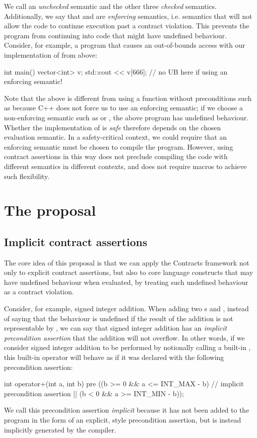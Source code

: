 We call  an \emph{unchecked} semantic and the other three \emph{checked} semantics. Additionally, we say that \mbox{} and  are \emph{enforcing} semantics, i.e. semantics that will not allow the code to continue execution past a contract violation. This prevents the program from continuing into code that might have undefined behaviour. Consider, for example, a program that causes an out-of-bounds access with our implementation of  from above:
\begin{codeblock}
int main() {
  vector<int> v;
  std::cout << v[666];    // no UB here if using an enforcing semantic!
}
\end{codeblock}
Note that the above is different from using a function without preconditions such as \mbox{} because C++ does not force us to use an enforcing semantic; if we choose a non-enforcing semantic such as  or , the above program  has undefined behaviour. Whether the implementation of   is \emph{safe} therefore depends on the chosen evaluation semantic. In a safety-critical context, we could require that an enforcing semantic must be chosen to compile the program. However, using contract assertions in this way does not preclude compiling the code with different semantics in different contexts, and does not require macros to achieve such flexibility.

\section{The proposal}

\subsection{Implicit contract assertions}

The core idea of this proposal is that we can apply the Contracts framework not only to explicit contract assertions, but also to core language constructs that may have undefined behaviour when evaluated, by treating such undefined behaviour as a contract violation.

Consider, for example, signed integer addition. When adding two s  and , instead of saying that the behaviour is undefined if the result of the addition is not representable by , we can say that signed integer addition has an \emph{implicit precondition assertion} that the addition will not overflow. In other words, if we consider signed integer addition to be performed by notionally calling a built-in , this built-in operator will behave as if it was declared with the following precondition assertion:
\begin{codeblock}
int operator+(int a, int b)
pre ((b >= 0 && a <= INT_MAX - b)  // implicit precondition assertion
  || (b < 0  && a >= INT_MIN - b));  
\end{codeblock}
We call this precondition assertion \emph{implicit} because it has not been added to the program in the form of an explicit, \cite{P2900R7} style precondition assertion, but is instead implicitly generated by the compiler.

